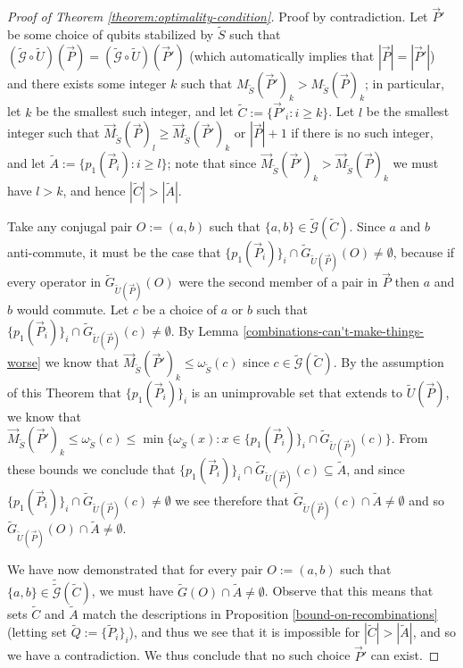 \documentclass{amsbook}
\theoremstyle{plain}
\theoremstyle{definition}
\theoremstyle{remark}
\newcommand{\lst}{\vec}
\newcommand{\set}{\tilde}
\newcommand{\genfun}{\tilde{\mathcal{G}}}
\newcommand{\om}{\omega}
\begin{document}
\begin{proof}[Proof of Theorem \ref{theorem:optimality-condition}]
Proof by contradiction.  Let $\lst P'$ be some choice of qubits stabilized by $\set S$ such that $(\genfun\circ\set U)(\lst P)=(\genfun\circ\set U)(\lst P')$ (which automatically implies that $|\lst P|=|\lst P'|$) and there exists some integer $k$ such that $M_{\set S}(\lst P')_k > M_{\set S}(\lst P)_k$;  in particular, let $k$ be the smallest such integer, and let $\set C:=\{\lst P'_i : i \ge k\}$.  Let $l$ be the smallest integer such that $\lst M_{\set S}(\lst P)_l\ge \lst M_{\set S}(\lst P')_k$ or $|\lst P|+1$ if there is no such integer, and let $\set A := \{p_1(\lst P_i) : i \ge l\}$; note that since $\lst M_{\set S}(\lst P')_k > \lst M_{\set S}(\lst P)_k$ we must have $l>k$, and hence $|\set C| > |\set A|$.

Take any conjugal pair $O:=(a,b)$ such that $\{a,b\}\in\genfun(\set C)$.  Since $a$ and $b$ anti-commute, it must be the case that $\{p_1(\lst P_i)\}_i\cap \set G_{\set U(\lst P)}(O)\ne\emptyset$, because if every operator in $\set G_{\set U(\lst P)}(O)$ were the second member of a pair in $\lst P$ then $a$ and $b$ would commute.  Let $c$ be a choice of $a$ or $b$ such that $\{p_1(\lst P_i)\}_i\cap \set G_{\set U(\lst P)}(c)\ne\emptyset$.  By Lemma \ref{combinations-can't-make-things-worse} we know that $\lst M_{\set S}(\lst P')_k\le\om_{\set S}(c)$ since $c\in\genfun(\set C)$.  By the assumption of this Theorem that $\{p_1(\lst P_i)\}_i$ is an unimprovable set that extends to $\set U(\lst P)$, we know that $\lst M_{\set S}(\lst P')_k \le \om_{\set S}(c)\le\min \{\om_{\set S}(x):x\in\{p_1(\lst P_i)\}_i\cap \set G_{\set U(\lst P)}(c)\}$.  From these bounds we conclude that $\{p_1(\lst P_i)\}_i\cap \set G_{\set U(\lst P)}(c)\subseteq \set A$, and since $\{p_1(\lst P_i)\}_i\cap \set G_{\set U(\lst P)}(c)\ne\emptyset$ we see therefore that $\set G_{\set U(\lst P)}(c)\cap\set A\ne\emptyset$ and so $\set G_{\set U(\lst P)}(O)\cap\set A\ne\emptyset$.

We have now demonstrated that for every pair $O:=(a,b)$ such that $\{a,b\}\in\set \genfun(\set C)$, we must have $\set G(O)\cap\set A \ne\emptyset$.  Observe that this means that sets $\set C$ and $\set A$ match the descriptions in Proposition \ref{bound-on-recombinations} (letting set $\set Q:=\{\set P_i\}_i$), and thus we see that it is impossible for $|\set C|>|\set A|$, and so we have a contradiction.  We thus conclude that no such choice $\lst P'$ can exist.
\end{proof}
\end{document}

